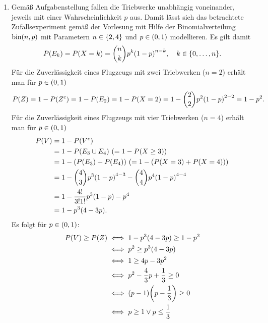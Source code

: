 \documentclass{exercise}
\begin{document}
    \begin{enumerate}
        \item Gemäß Aufgabenstellung fallen die Triebwerke unabhängig voneinander, jeweils mit einer Wahrscheinlichkeit \(p\) aus.
        Damit lässt sich das betrachtete Zufallsexperiment gemäß der Vorlesung mit Hilfe der Binomialverteilung \(\bin\parentheses*{n, p}\) mit Parametern \(n \in \braces*{2, 4}\) und \(p \in \parentheses*{0, 1}\) modellieren.
        Es gilt damit
        \[
            P\parentheses*{E_k} = P\parentheses*{X = k} = \binom{n}{k}p^k\parentheses*{1 - p}^{n - k}, \quad k \in \braces*{0, \ldots, n}.
        \]
        Für die Zuverlässigkeit eines Flugzeugs mit zwei Triebwerken (\(n = 2\)) erhält man für \(p \in \parentheses*{0, 1}\)
        \[
            P\parentheses*{Z} = 1 - P\parentheses*{Z^c} = 1 - P\parentheses*{E_2} = 1 - P\parentheses*{X = 2} = 1 - \binom{2}{2}p^2\parentheses*{1 - p}^{2 - 2} = 1 - p^2.
        \]
        Für die Zuverlässigkeit eines Flugzeugs mit vier Triebwerken (\(n = 4\)) erhält man für \(p \in \parentheses*{0, 1}\)
        \begin{align*}
            P\parentheses*{V} &= 1 - P\parentheses*{V^c}\\
            &= 1 - P\parentheses*{E_3 \cup E_4}\ \parentheses*{= 1 - P\parentheses*{X \ge 3}}\\
            &= 1 - \parentheses*{P\parentheses*{E_3} + P\parentheses*{E_4}}\ \parentheses*{= 1 - \parentheses*{P\parentheses*{X = 3} + P\parentheses*{X = 4}}}\\
            &= 1 - \binom{4}{3}p^3\parentheses*{1 - p}^{4 - 3} - \binom{4}{4}p^4\parentheses*{1 - p}^{4 - 4}\\
            &= 1 - \frac{4!}{3!1!}p^3\parentheses*{1 - p} - p^4\\
            &= 1 - p^3\parentheses*{4 - 3p}.
        \end{align*}
        Es folgt für \(p \in \parentheses*{0, 1}\):
        \begin{align*}
            P\parentheses*{V} \ge P\parentheses*{Z} &\iff 1 - p^3\parentheses*{4 - 3p} \ge 1 - p^2\\
            &\iff p^2 \ge p^3\parentheses*{4 - 3p}\\
            &\iff 1 \ge 4p - 3p^2\\
            &\iff p^2 - \frac{4}{3}p + \frac{1}{3} \ge 0\\
            &\iff \parentheses*{p - 1}\parentheses*{p - \frac{1}{3}} \ge 0\\
            &\iff p \ge 1 \lor p \le \frac{1}{3}

\end{align*}
\end{enumerate}
\end{document}
